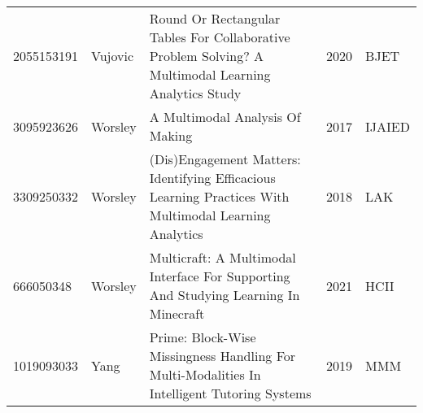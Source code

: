 \begin{landscape}
\begin{longtable}{llp{4in}rl}
2055153191 \cite{2055153191} & Vujovic & Round Or Rectangular Tables For Collaborative Problem Solving? A Multimodal Learning Analytics Study & 2020 & BJET \\
3095923626 \cite{3095923626} & Worsley & A Multimodal Analysis Of Making & 2017 & IJAIED \\
3309250332 \cite{3309250332} & Worsley & (Dis)Engagement Matters: Identifying Efficacious Learning Practices With Multimodal Learning Analytics & 2018 & LAK \\
666050348 \cite{666050348} & Worsley & Multicraft: A Multimodal Interface For Supporting And Studying Learning In Minecraft & 2021 & HCII \\
1019093033 \cite{1019093033} & Yang & Prime: Block-Wise Missingness Handling For Multi-Modalities In Intelligent Tutoring Systems & 2019 & MMM \\
\bottomrule
\end{longtable}
\end{landscape}
